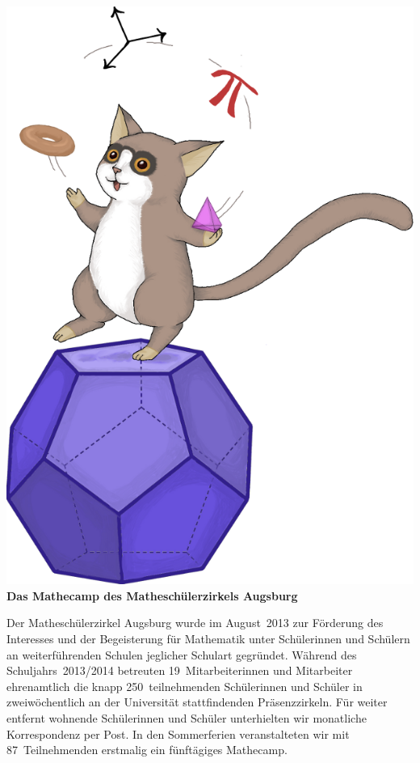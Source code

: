 \documentclass[12pt]{zettel}
\begin{document}
\pagestyle{plain}

\renewcommand{\betreff}{}

\vspace{-2em}

\begin{center}
  {\qquad\quad}\includegraphics[scale=0.18]{cover}\\[1cm]

  \Large\textbf{\textsf{Das Mathecamp des Matheschülerzirkels Augsburg}}
\end{center}

\vspace{1em}

Der Matheschülerzirkel Augsburg wurde im August~2013 zur Förderung des
Interesses und der Begeisterung für Mathematik unter Schülerinnen und Schülern
an weiterführenden Schulen jeglicher Schulart gegründet. Während des Schuljahrs~2013/2014 betreuten
19~Mitarbeiterinnen und Mitarbeiter ehrenamtlich die knapp
250~teilnehmenden Schülerinnen und Schüler in zweiwöchentlich an der
Universität stattfindenden Präsenzzirkeln. Für weiter entfernt wohnende Schülerinnen
und Schüler unterhielten wir monatliche Korrespondenz per Post. In den
Sommerferien veranstalteten wir mit 87~Teilnehmenden erstmalig ein fünftägiges Mathecamp.
\end{document}
